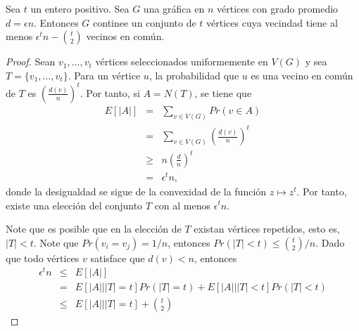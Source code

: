 \begin{theorem}
  Sea $t$ un entero positivo. Sea $G$ una gráfica en $n$ vértices con
  grado promedio $d = \epsilon n$.
  Entonces $G$ continee un conjunto de $t$ vértices cuya vecindad
  tiene al menos $\epsilon^t n - \binom{t}{2}$ vecinos en común.
\end{theorem}
\begin{proof} %
  Sean $v_1, \ldots, v_t$ vértices seleccionados uniformemente en
  $V(G)$ y sea $T = \{v_1, \ldots, v_t\}$. Para un vértice $u$, la
  probabilidad que $u$ es una vecino en común de $T$ es
  $\left(\frac{d(v)}{n}\right)^t$.
  Por tanto, si $A = N(T)$, se tiene que
  \begin{eqnarray*}
    E[\vert A \vert] &=& \sum_{v \in V(G)} Pr(v \in A) \\
    &=& \sum_{v \in V(G)} \left(\frac{d(v)}{n} \right)^t \\
    &\ge& n \left(\frac{d}{n}\right)^t\\
    &=& \epsilon^t n,
  \end{eqnarray*}
  donde la desigualdad se sigue de la convexidad de la función $z \mapsto z^t$.
  Por tanto, existe una elección del conjunto $T$ con al menos $\epsilon^t n $.

  Note que es posible que en la elección de $T$ existan vértices
  repetidos, esto es, $\vert T \vert < t$. Note que $Pr(v_i = v_j) =
  1 / n$, entonces
  $Pr(\vert T \vert < t) \le \binom{t}{2} / n$. Dado que todo
  vértices $v$ satisface que
  $d(v) < n$, entonces
  \begin{eqnarray*}
    \epsilon^t n &\le& E[\vert A \vert] \\
    &=& E[\vert A \vert | \vert T \vert = t] Pr(\vert T \vert = t) +
    E[\vert A \vert | \vert T \vert < t] Pr(\vert T \vert < t)  \\
    &\le& E[\vert A \vert | \vert T \vert = t] + \binom{t}{2}
  \end{eqnarray*}
\end{proof}

